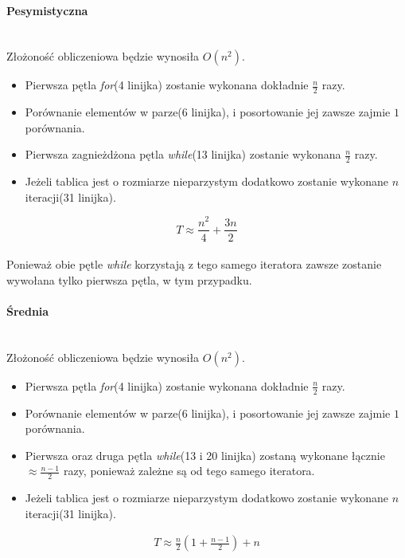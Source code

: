 \paragraph{Pesymistyczna}\mbox{}\\
Złożoność obliczeniowa będzie wynosiła $O(n^2)$.
\begin{itemize}
\item Pierwsza pętla \textit{for}(4 linijka) zostanie wykonana dokładnie $\frac{n}{2}$ razy.
\item Porównanie elementów w parze(6 linijka), i posortowanie jej zawsze zajmie $1$ porównania.
\item Pierwsza zagnieżdżona pętla \textit{while}(13 linijka) zostanie wykonana $\frac{n}{2}$ razy.
\item Jeżeli tablica jest o rozmiarze nieparzystym dodatkowo zostanie wykonane $n$ iteracji(31 linijka).
\end{itemize}
\begin{equation*}
T \approx \frac{n^2}{4} + \frac{3n}{2} 
\end{equation*}
\wyjT\\
Ponieważ obie pętle \textit{while} korzystają z tego samego iteratora zawsze zostanie wywołana tylko pierwsza pętla, w tym przypadku.
\paragraph{Średnia}\mbox{}\\
Złożoność obliczeniowa będzie wynosiła $O(n^2)$.

\begin{itemize}
\item Pierwsza pętla \textit{for}(4 linijka) zostanie wykonana dokładnie $\frac{n}{2}$ razy.
\item Porównanie elementów w parze(6 linijka), i posortowanie jej zawsze zajmie $1$ porównania.
\item Pierwsza oraz druga  pętla \textit{while}(13 i 20 linijka) zostaną wykonane łącznie $\approx \frac{n-1}{2}$ razy, ponieważ zależne są od tego samego iteratora.
\item Jeżeli tablica jest o rozmiarze nieparzystym dodatkowo zostanie wykonane $n$ iteracji(31 linijka).
\end{itemize}
\begin{equation*}
\begin{multlined}
T \approx \frac{n}{2} (1+ \frac{n-1}{2})+ n
\end{multlined}
\end{equation*}

